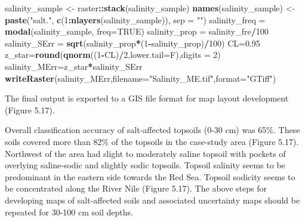 \documentclass[
  10pt,
  b5paper,
]{book}
\newenvironment{Shaded}{\begin{snugshade}}{\end{snugshade}}
\newcommand{\DataTypeTok}[1]{\textcolor[rgb]{0.13,0.29,0.53}{#1}}
\newcommand{\DecValTok}[1]{\textcolor[rgb]{0.00,0.00,0.81}{#1}}
\newcommand{\FloatTok}[1]{\textcolor[rgb]{0.00,0.00,0.81}{#1}}
\newcommand{\KeywordTok}[1]{\textcolor[rgb]{0.13,0.29,0.53}{\textbf{#1}}}
\newcommand{\NormalTok}[1]{#1}
\newcommand{\OperatorTok}[1]{\textcolor[rgb]{0.81,0.36,0.00}{\textbf{#1}}}
\newcommand{\OtherTok}[1]{\textcolor[rgb]{0.56,0.35,0.01}{#1}}
\newcommand{\StringTok}[1]{\textcolor[rgb]{0.31,0.60,0.02}{#1}}
\begin{document}
\begin{Shaded}
\begin{Highlighting}[]
\NormalTok{	salinity_sample <-}\StringTok{ }\NormalTok{raster}\OperatorTok{::}\KeywordTok{stack}\NormalTok{(salinity_sample)}
	\KeywordTok{names}\NormalTok{(salinity_sample) <-}\StringTok{ }\KeywordTok{paste}\NormalTok{(}\StringTok{"salt."}\NormalTok{, }\KeywordTok{c}\NormalTok{(}\DecValTok{1}\OperatorTok{:}\KeywordTok{nlayers}\NormalTok{(salinity_sample)), }\DataTypeTok{sep =} \StringTok{""}\NormalTok{)}
\NormalTok{	salinity_freq =}\StringTok{ }\KeywordTok{modal}\NormalTok{(salinity_sample, }\DataTypeTok{freq=}\OtherTok{TRUE}\NormalTok{)}
\NormalTok{	salinity_prop =}\StringTok{ }\NormalTok{salinity_fre}\OperatorTok{/}\DecValTok{100}
\NormalTok{	salinity_SErr =}\StringTok{ }\KeywordTok{sqrt}\NormalTok{(salinity_prop}\OperatorTok{*}\NormalTok{(}\DecValTok{1}\OperatorTok{-}\NormalTok{salinity_prop)}\OperatorTok{/}\DecValTok{100}\NormalTok{)}
\NormalTok{	CL=}\FloatTok{0.95}
\NormalTok{	z_star=}\KeywordTok{round}\NormalTok{(}\KeywordTok{qnorm}\NormalTok{((}\DecValTok{1}\OperatorTok{-}\NormalTok{CL)}\OperatorTok{/}\DecValTok{2}\NormalTok{,}\DataTypeTok{lower.tail=}\NormalTok{F),}\DataTypeTok{digits =} \DecValTok{2}\NormalTok{)}
\NormalTok{	salinity_MErr=z_star}\OperatorTok{*}\NormalTok{salinity_SErr}
	\KeywordTok{writeRaster}\NormalTok{(salinity_MErr,}\DataTypeTok{filename=}\StringTok{"Salinity_ME.tif"}\NormalTok{,}\DataTypeTok{format=}\StringTok{"GTiff"}\NormalTok{)}
\end{Highlighting}
\end{Shaded}

The final output is exported to a GIS file format for map layout development (Figure 5.17).

Overall classification accuracy of salt-affected topsoils (0-30 cm) was 65\%. These soils covered more than 82\% of the topsoils in the case-study area (Figure 5.17). Northwest of the area had slight to moderately saline topsoil with pockets of overlying saline-sodic and slightly sodic topsoils. Topsoil salinity seems to be predominant in the eastern side towards the Red Sea. Topsoil sodicity seems to be concentrated along the River Nile (Figure 5.17).
The above steps for developing maps of salt-affected soils and associated uncertainty maps should be repeated for 30-100 cm soil depths.
\end{document}
